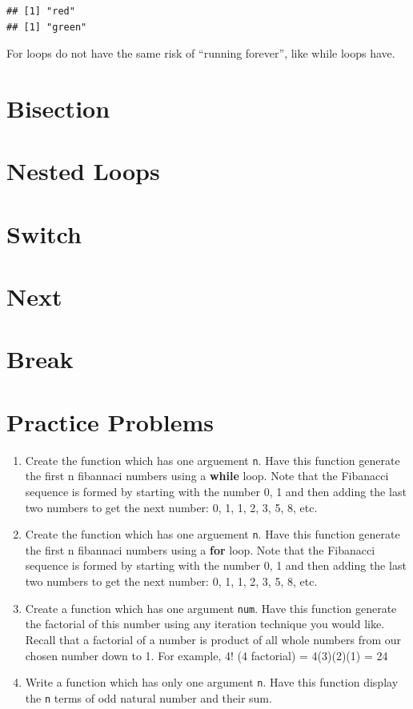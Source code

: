 \documentclass[
]{book}
\begin{document}
\begin{verbatim}
## [1] "red"
## [1] "green"
\end{verbatim}

For loops do not have the same risk of ``running forever'', like while loops have.

\hypertarget{bisection}{%
\section{Bisection}\label{bisection}}

\hypertarget{nested-loops}{%
\section{Nested Loops}\label{nested-loops}}

\hypertarget{switch}{%
\section{Switch}\label{switch}}

\hypertarget{next}{%
\section{Next}\label{next}}

\hypertarget{break}{%
\section{Break}\label{break}}

\hypertarget{practice-problems}{%
\section*{Practice Problems}\label{practice-problems}}

\begin{enumerate}
\def\labelenumi{\arabic{enumi})}
\item
  Create the function which has one arguement \texttt{n}. Have this function generate the first n fibannaci numbers using a \textbf{while} loop. Note that the Fibanacci sequence is formed by starting with the number 0, 1 and then adding the last two numbers to get the next number: 0, 1, 1, 2, 3, 5, 8, etc.
\item
  Create the function which has one arguement \texttt{n}. Have this function generate the first n fibannaci numbers using a \textbf{for} loop. Note that the Fibanacci sequence is formed by starting with the number 0, 1 and then adding the last two numbers to get the next number: 0, 1, 1, 2, 3, 5, 8, etc.
\item
  Create a function which has one argument \texttt{num}. Have this function generate the factorial of this number using any iteration technique you would like. Recall that a factorial of a number is product of all whole numbers from our chosen number down to 1. For example, 4! (4 factorial) = 4(3)(2)(1) = 24
\item
  Write a function which has only one argument \texttt{n}. Have this function display the \texttt{n} terms of odd natural number and their sum.
\end{enumerate}
\end{document}
